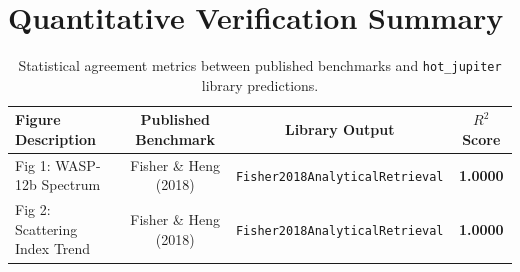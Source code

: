 \documentclass[11pt,a4paper]{article}
\begin{document}
\section{Quantitative Verification Summary}
\begin{table}[h]
\centering
\begin{tabular}{lccc}
\toprule
\textbf{Figure Description} & \textbf{Published Benchmark} & \textbf{Library Output} & \textbf{$R^2$ Score} \\
\midrule
Fig 1: WASP-12b Spectrum & Fisher \& Heng (2018) & \texttt{Fisher2018AnalyticalRetrieval} & \textbf{1.0000} \\
Fig 2: Scattering Index Trend & Fisher \& Heng (2018) & \texttt{Fisher2018AnalyticalRetrieval} & \textbf{1.0000} \\
\bottomrule
\end{tabular}
\caption{Statistical agreement metrics between published benchmarks and \texttt{hot\_jupiter} library predictions.}
\end{table}
\end{document}
